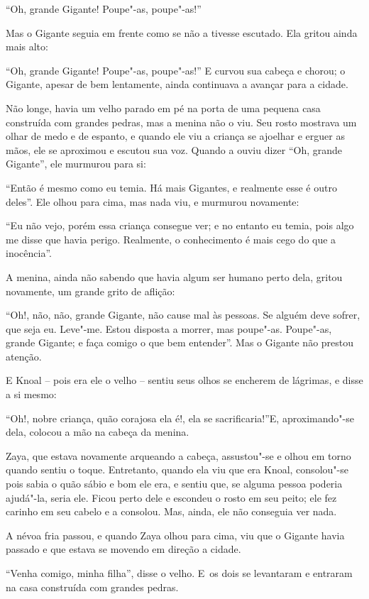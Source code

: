 ``Oh, grande Gigante! Poupe"-as, poupe"-as!''

Mas o Gigante seguia em frente como se não a tivesse escutado. Ela
gritou ainda mais alto:

``Oh, grande Gigante! Poupe"-as, poupe"-as!'' E curvou sua cabeça e
chorou; o Gigante, apesar de bem lentamente, ainda continuava a avançar
para a cidade.

Não longe, havia um velho parado em pé na porta de uma pequena casa
construída com grandes pedras, mas a menina não o viu. Seu rosto
mostrava um olhar de medo e de espanto, e quando ele viu a criança se
ajoelhar e erguer as mãos, ele se aproximou e escutou sua voz. Quando a
ouviu dizer ``Oh, grande Gigante'', ele murmurou para si:

``Então é mesmo como eu temia. Há mais Gigantes, e realmente esse é
outro deles''. Ele olhou para cima, mas nada viu, e murmurou novamente:

``Eu não vejo, porém essa criança consegue ver; e no entanto eu temia,
pois algo me disse que havia perigo. Realmente, o conhecimento é mais
cego do que a inocência''.

A menina, ainda não sabendo que havia algum ser humano perto dela,
gritou novamente, um grande grito de aflição:

``Oh!, não, não, grande Gigante, não cause mal às pessoas. Se alguém
deve sofrer, que seja eu. Leve"-me. Estou disposta a morrer, mas
poupe"-as. Poupe"-as, grande Gigante; e faça comigo o que bem entender''.
Mas o Gigante não prestou atenção.

E Knoal -- pois era ele o velho -- sentiu seus olhos se encherem de
lágrimas, e disse a si mesmo:

``Oh!, nobre criança, quão corajosa ela é!, ela se sacrificaria!''E,
aproximando"-se dela, colocou a mão na cabeça da menina.

Zaya, que estava novamente arqueando a cabeça, assustou"-se e olhou em
torno quando sentiu o toque. Entretanto, quando ela viu que era Knoal,
consolou"-se pois sabia o quão sábio e bom ele era, e sentiu que, se
alguma pessoa poderia ajudá"-la, seria ele. Ficou perto dele e escondeu o
rosto em seu peito; ele fez carinho em seu cabelo e a consolou. Mas,
ainda, ele não conseguia ver nada.

A névoa fria passou, e quando Zaya olhou para cima, viu que o Gigante
havia passado e que estava se movendo em direção a cidade.

``Venha comigo, minha filha'', disse o velho. E~os dois se levantaram e
entraram na casa construída com grandes pedras.

